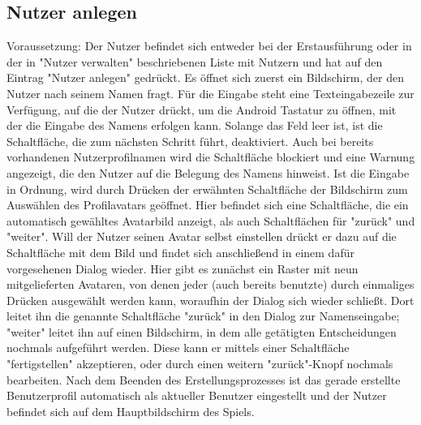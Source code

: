 \subsection{Nutzer anlegen}
Voraussetzung: Der Nutzer befindet sich entweder bei der Erstausführung oder 
in der in "Nutzer verwalten" beschriebenen Liste mit Nutzern und hat auf 
den Eintrag "Nutzer anlegen" gedrückt.
\newline
\newline
Es öffnet sich zuerst ein Bildschirm, der den Nutzer nach seinem Namen fragt.
Für die Eingabe steht eine Texteingabezeile zur Verfügung, auf die der
Nutzer drückt, um die Android Tastatur zu öffnen, mit der die Eingabe des
Namens erfolgen kann. Solange das Feld leer ist, ist die Schaltfläche, 
die zum nächsten Schritt führt, deaktiviert. Auch bei bereits vorhandenen
Nutzerprofilnamen wird die Schaltfläche blockiert und eine Warnung angezeigt,
die den Nutzer auf die Belegung des Namens hinweist. Ist die Eingabe
in Ordnung, wird durch Drücken der erwähnten Schaltfläche der Bildschirm
zum Auswählen des Profilavatars geöffnet. Hier befindet sich eine
Schaltfläche, die ein automatisch gewähltes Avatarbild anzeigt,
als auch Schaltflächen für "zurück" und "weiter". Will der Nutzer seinen 
Avatar selbst einstellen drückt er dazu auf die Schaltfläche mit dem Bild
und findet sich anschließend in einem dafür vorgesehenen Dialog wieder.
Hier gibt es zunächst ein Raster mit neun mitgelieferten Avataren,
von denen jeder (auch bereits benutzte) durch einmaliges Drücken ausgewählt
werden kann, woraufhin der Dialog sich wieder schließt. Dort leitet ihn
die genannte Schaltfläche "zurück" in den Dialog zur Namenseingabe; "weiter"
leitet ihn auf einen Bildschirm, in dem alle getätigten Entscheidungen
nochmals aufgeführt werden. Diese kann er mittels einer Schaltfläche 
"fertigstellen" akzeptieren, oder durch einen weitern "zurück"-Knopf 
nochmals bearbeiten.
\newline
\newline
Nach dem Beenden des Erstellungsprozesses ist das gerade erstellte 
Benutzerprofil automatisch als aktueller Benutzer eingestellt und der Nutzer
befindet sich auf dem Hauptbildschirm des Spiels.

